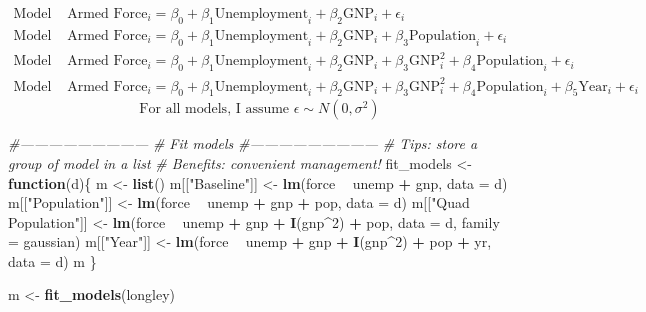\documentclass[11pt,]{article}
\newenvironment{Shaded}{\begin{snugshade}}{\end{snugshade}}
\newcommand{\KeywordTok}[1]{\textcolor[rgb]{0.13,0.29,0.53}{\textbf{#1}}}
\newcommand{\DataTypeTok}[1]{\textcolor[rgb]{0.13,0.29,0.53}{#1}}
\newcommand{\DecValTok}[1]{\textcolor[rgb]{0.00,0.00,0.81}{#1}}
\newcommand{\StringTok}[1]{\textcolor[rgb]{0.31,0.60,0.02}{#1}}
\newcommand{\CommentTok}[1]{\textcolor[rgb]{0.56,0.35,0.01}{\textit{#1}}}
\newcommand{\ControlFlowTok}[1]{\textcolor[rgb]{0.13,0.29,0.53}{\textbf{#1}}}
\newcommand{\OperatorTok}[1]{\textcolor[rgb]{0.81,0.36,0.00}{\textbf{#1}}}
\newcommand{\NormalTok}[1]{#1}
\begin{document}
\begin{align*}
  \text{Model 1: } & \text{Armed Force}_i = \beta_0 + \beta_1 \text{Unemployment}_i + \beta_2 \text{GNP}_i + \epsilon_i \\
  \text{Model 2: } & \text{Armed Force}_i = \beta_0 + \beta_1 \text{Unemployment}_i + \beta_2 \text{GNP}_i + \beta_3 \text{Population}_i + \epsilon_i \\
  \text{Model 3: } & \text{Armed Force}_i = \beta_0 + \beta_1 \text{Unemployment}_i + \beta_2 \text{GNP}_i  + \beta_3 \text{GNP}_i^2 + \beta_4 \text{Population}_i + \epsilon_i \\
  \text{Model 4: } & \text{Armed Force}_i = \beta_0 + \beta_1 \text{Unemployment}_i + \beta_2 \text{GNP}_i  + \beta_3 \text{GNP}_i^2 + \beta_4 \text{Population}_i + \beta_5 \text{Year}_i + \epsilon_i
\end{align*}\begin{equation*}
  \text{For all models, I assume } \epsilon \sim N(0, \sigma^2)
\end{equation*}

\tiny

\begin{Shaded}
\begin{Highlighting}[]
\CommentTok{#---------------------------}
\CommentTok{# Fit models}
\CommentTok{#---------------------------}
  \CommentTok{# Tips: store a group of model in a list}
  \CommentTok{# Benefits: convenient management! }
\NormalTok{  fit_models <-}\StringTok{ }\ControlFlowTok{function}\NormalTok{(d)\{}
\NormalTok{    m <-}\StringTok{ }\KeywordTok{list}\NormalTok{()}
\NormalTok{    m[[}\StringTok{"Baseline"}\NormalTok{]] <-}\StringTok{ }\KeywordTok{lm}\NormalTok{(force }\OperatorTok{~}\StringTok{ }\NormalTok{unemp }\OperatorTok{+}\StringTok{ }\NormalTok{gnp, }\DataTypeTok{data =}\NormalTok{ d)}
\NormalTok{    m[[}\StringTok{"Population"}\NormalTok{]] <-}\StringTok{ }\KeywordTok{lm}\NormalTok{(force }\OperatorTok{~}\StringTok{ }\NormalTok{unemp }\OperatorTok{+}\StringTok{ }\NormalTok{gnp }\OperatorTok{+}\StringTok{ }\NormalTok{pop, }\DataTypeTok{data =}\NormalTok{ d)}
\NormalTok{    m[[}\StringTok{"Quad Population"}\NormalTok{]] <-}\StringTok{ }\KeywordTok{lm}\NormalTok{(force }\OperatorTok{~}\StringTok{ }\NormalTok{unemp }\OperatorTok{+}\StringTok{ }\NormalTok{gnp }\OperatorTok{+}\StringTok{ }\KeywordTok{I}\NormalTok{(gnp}\OperatorTok{^}\DecValTok{2}\NormalTok{) }\OperatorTok{+}\StringTok{ }\NormalTok{pop, }\DataTypeTok{data =}\NormalTok{ d, }
                                  \DataTypeTok{family =}\NormalTok{ gaussian)}
\NormalTok{    m[[}\StringTok{"Year"}\NormalTok{]] <-}\StringTok{ }\KeywordTok{lm}\NormalTok{(force }\OperatorTok{~}\StringTok{ }\NormalTok{unemp }\OperatorTok{+}\StringTok{ }\NormalTok{gnp }\OperatorTok{+}\StringTok{ }\KeywordTok{I}\NormalTok{(gnp}\OperatorTok{^}\DecValTok{2}\NormalTok{) }\OperatorTok{+}\StringTok{ }\NormalTok{pop }\OperatorTok{+}\StringTok{ }\NormalTok{yr, }\DataTypeTok{data =}\NormalTok{ d)}
\NormalTok{    m}
\NormalTok{  \}}

\NormalTok{  m <-}\StringTok{ }\KeywordTok{fit_models}\NormalTok{(longley)}
\end{Highlighting}
\end{Shaded}
\end{document}
